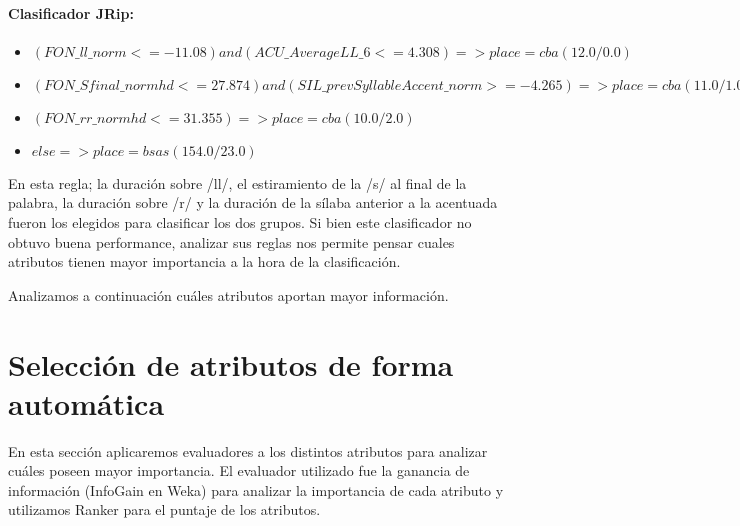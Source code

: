 \paragraph*{Clasificador JRip:}

\begin{flushleft}
\begin{itemize}

\item $(FON\_ll\_norm <= -11.08) and (ACU\_AverageLL\_6 <= 4.308) => place=cba (12.0/0.0)$ \\
\item $(FON\_Sfinal\_normhd <= 27.874) and (SIL\_prevSyllableAccent\_norm >= -4.265) => place=cba (11.0/1.0)$ \\
\item $(FON\_rr\_normhd <= 31.355) => place=cba (10.0/2.0)$ \\
\item $ else  => place=bsas (154.0/23.0)$
\end{itemize}
\end{flushleft}

En esta regla; la duración sobre /ll/, el estiramiento de la /s/ al final de la palabra, la duración sobre /r/ y la duración de la sílaba anterior a la acentuada fueron los elegidos para clasificar los dos grupos. Si bien este clasificador no obtuvo buena performance, analizar sus reglas nos permite pensar cuales atributos tienen mayor importancia a la hora de la clasificación.

Analizamos a continuación cuáles atributos aportan mayor información.

\section{Selección de atributos de forma automática}



En esta sección aplicaremos evaluadores a los distintos atributos para analizar cuáles poseen mayor importancia. El evaluador utilizado fue la ganancia de información (InfoGain en Weka) para analizar la importancia de cada atributo y utilizamos Ranker para el puntaje de los atributos. 

